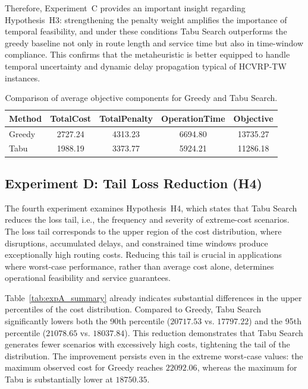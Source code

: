 Therefore, Experiment~C provides an important insight regarding Hypothesis~H3: strengthening the penalty weight amplifies the importance of temporal feasibility, and under these conditions Tabu Search outperforms the greedy baseline not only in route length and service time but also in time-window compliance. This confirms that the metaheuristic is better equipped to handle temporal uncertainty and dynamic delay propagation typical of HCVRP-TW instances.


\begin{table}[ht]
\renewcommand{\arraystretch}{1.3}
\centering
\caption{Comparison of average objective components for Greedy and Tabu Search.}
\label{tab:avg_penalty_components}
\begin{tabular}{l|c|c|c|c}
\hline\hline
Method & TotalCost & TotalPenalty & OperationTime & Objective \\
\hline\hline
Greedy & 2727.24 & 4313.23 & 6694.80 & 13735.27 \\ \hline
Tabu   & 1988.19 & 3373.77 & 5924.21 & 11286.18 \\
\hline\hline
\end{tabular}
\end{table}













\subsection{Experiment D: Tail Loss Reduction (H4)}

The fourth experiment examines Hypothesis~H4, which states that Tabu Search reduces the loss tail, i.e., the frequency and severity of extreme-cost scenarios. The loss tail corresponds to the upper region of the cost distribution, where disruptions, accumulated delays, and constrained time windows produce exceptionally high routing costs. Reducing this tail is crucial in applications where worst-case performance, rather than average cost alone, determines operational feasibility and service guarantees.

Table~\ref{tab:expA_summary} already indicates substantial differences in the upper percentiles of the cost distribution. Compared to Greedy, Tabu Search significantly lowers both the 90th percentile ($20717.53$ vs. $17797.22$) and the 95th percentile ($21078.65$ vs. $18037.84$). This reduction demonstrates that Tabu Search generates fewer scenarios with excessively high costs, tightening the tail of the distribution. The improvement persists even in the extreme worst-case values: the maximum observed cost for Greedy reaches $22092.06$, whereas the maximum for Tabu is substantially lower at $18750.35$. 

